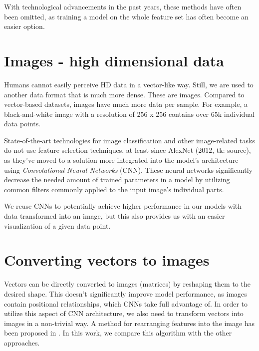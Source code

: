 With technological advancements in the past years, these methods have often been omitted, as training a model on the whole feature set has often become an easier option.

\section{Images - high dimensional data}
Humans cannot easily perceive HD data in a vector-like way. Still, we are used to another data format that is much more dense. These are images. Compared to vector-based datasets, images have much more data per sample. For example, a black-and-white image with a resolution of 256 x 256 contains over 65k individual data points. 

State-of-the-art technologies for image classification and other image-related tasks do not use feature selection techniques, at least since AlexNet (2012, tk: source), as they've moved to a solution more integrated into the model's architecture using \textit{Convolutional Neural Networks} (CNN). These neural networks significantly decrease the needed amount of trained parameters in a model by utilizing common filters commonly applied to the input image's individual parts.

We reuse CNNs to potentially achieve higher performance in our models with data transformed into an image, but this also provides us with an easier visualization of a given data point. 

\section{Converting vectors to images}
Vectors can be directly converted to images (matrices) by reshaping them to the desired shape. This doesn't significantly improve model performance, as images contain positional relationships, which CNNs take full advantage of. In order to utilize this aspect of CNN architecture, we also need to transform vectors into images in a non-trivial way. 
A method for rearranging features into the image has been proposed in \cite{REFINED}. In this work, we compare this algorithm with the other approaches.
